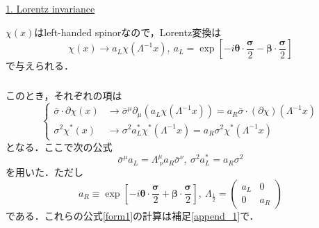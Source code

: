 \documentclass[pdflatex,unicode,ja=standard,12pt]{beamer}
\begin{document}
\begin{frame}
  
  \frametitle{\subsecname}

  \uline{1. Lorentz invariance}
  
  \vspace{5pt}

  $\chi(x)$はleft-handed spinorなので，Lorentz変換は
  \begin{equation}
    \chi(x)
    \rightarrow
    a_L\chi(\Lambda^{-1}x)
    ,\ 
    a_L
    =
    \exp\left[  
      -
      i\bm{\theta}\cdot\frac{\bm{\sigma}}{2}
      -
      \bm{\beta}\cdot\frac{\bm{\sigma}}{2}
    \right]
  \end{equation}
  で与えられる．

\end{frame}

\begin{frame}
  
  \frametitle{\subsecname}

    このとき，それぞれの項は
    \begin{equation}
      \left\{
        \begin{alignedat}{1}
          \bar{\sigma}\cdot\partial\chi(x)
          &\rightarrow
          \bar{\sigma}^{\mu}
          \partial_{\mu}
          \left(  
            a_L\chi(\Lambda^{-1}x)
          \right)
          =
          a_R\bar{\sigma}\cdot(\partial\chi)(\Lambda^{-1}x)
          \\
          \sigma^2\chi^{*}(x)
          &\rightarrow
          \sigma^2
          a_L^{*}\chi^{*}(\Lambda^{-1}x)
          =
          a_R\sigma^2\chi^{*}(\Lambda^{-1}x)
        \end{alignedat}
      \right.
    \end{equation}
    となる．ここで次の公式
    \begin{equation}
      \bar{\sigma}^{\mu}a_L
      =
      \Lambda^{\mu}_{\ \nu}a_R\bar{\sigma}^{\nu}
      ,\ 
      \sigma^{2} a_L^{*}=a_R \sigma^2
      \label{form1}
    \end{equation}
    を用いた．ただし
    \begin{equation}
      a_R
      \equiv
      \exp
      \left[  
        -
        i\bm{\theta}\cdot\frac{\bm{\sigma}}{2}
        +
        \bm{\beta}\cdot\frac{\bm{\sigma}}{2}
      \right]
      ,\ 
      \Lambda_{\frac{1}{2}}
      =
      \begin{pmatrix}
        a_L & 0 \\
        0 & a_R
      \end{pmatrix}
    \end{equation}
    である．これらの公式\eqref{form1}の計算は補足\ref{append_1}で．    

\end{frame}
\end{document}
